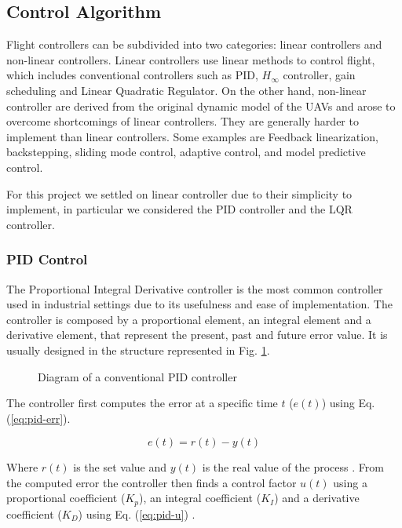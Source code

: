 \subsection{Control Algorithm}

Flight controllers can be subdivided into two categories: linear controllers and non-linear controllers.
Linear controllers use linear methods to control flight, which includes conventional controllers such as
PID, $H_{\infty}$ controller, gain scheduling and Linear Quadratic Regulator. On the other hand, non-linear controller
are derived from the original dynamic model of the UAVs and arose to overcome shortcomings of linear
controllers. They are generally harder to implement than linear controllers. Some examples are Feedback linearization, backstepping,
sliding mode control, adaptive control, and model predictive control. \autocite{NH20}

For this project we settled on linear controller due to their simplicity to implement, in particular
we considered the PID controller and the LQR controller.

\subsubsection{PID Control}

The Proportional Integral Derivative controller is the most common controller used in industrial settings
due to its usefulness and ease of implementation. \autocite{IL23} The controller is composed by a proportional
element, an integral element and a derivative element, that represent the present, past and future error value\autocite{AM09}. 
It is usually designed in the structure represented in Fig. \ref{fig:pid}.

\begin{figure}
	\begin{center}
		
	\end{center}
	\caption{Diagram of a conventional PID controller}\label{fig:pid}
\end{figure}

The controller first computes the error at a specific time $t$ ($e(t)$) using Eq. (\ref{eq:pid-err}).

\begin{equation}
	e(t) = r(t) - y(t)
	\label{eq:pid-err}
\end{equation}

Where $r(t)$ is the set value and $y(t)$ is the real value of the process \autocite{AM09}. 
From the computed error the controller then finds a control factor $u(t)$ using a proportional
coefficient ($K_p$), an integral coefficient ($K_I$) and a derivative coefficient ($K_D$) 
using Eq. (\ref{eq:pid-u}) \autocite{NH20}.

